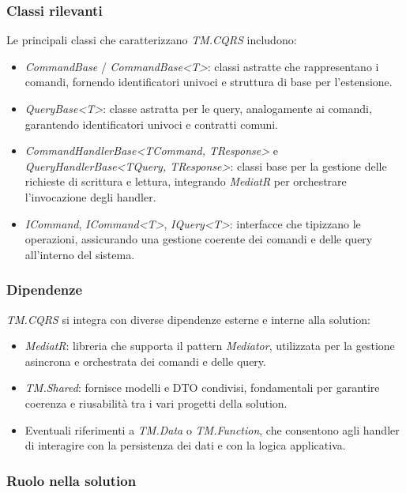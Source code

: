 \subsubsection{Classi rilevanti}

Le principali classi che caratterizzano \textit{TM.CQRS} includono:
\begin{itemize}
\item \textit{CommandBase} / \textit{CommandBase<T>}: classi astratte che rappresentano i comandi, fornendo identificatori univoci e struttura di base per l'estensione.
\item \textit{QueryBase<T>}: classe astratta per le query, analogamente ai comandi, garantendo identificatori univoci e contratti comuni.
\item \textit{CommandHandlerBase<TCommand, TResponse>} e \textit{QueryHandlerBase<TQuery, TResponse>}: classi base per la gestione delle richieste di scrittura e lettura, integrando \textit{MediatR} per orchestrare l'invocazione degli handler.
\item \textit{ICommand}, \textit{ICommand<T>}, \textit{IQuery<T>}: interfacce che tipizzano le operazioni, assicurando una gestione coerente dei comandi e delle query all'interno del sistema.
\end{itemize}

\subsubsection{Dipendenze}

\textit{TM.CQRS} si integra con diverse dipendenze esterne e interne alla solution:
\begin{itemize}
\item \textit{MediatR}: libreria che supporta il pattern \textit{Mediator}, utilizzata per la gestione asincrona e orchestrata dei comandi e delle query.
\item \textit{TM.Shared}: fornisce modelli e DTO condivisi, fondamentali per garantire coerenza e riusabilità tra i vari progetti della solution.
\item Eventuali riferimenti a \textit{TM.Data} o \textit{TM.Function}, che consentono agli handler di interagire con la persistenza dei dati e con la logica applicativa.
\end{itemize}

\subsubsection{Ruolo nella solution}

